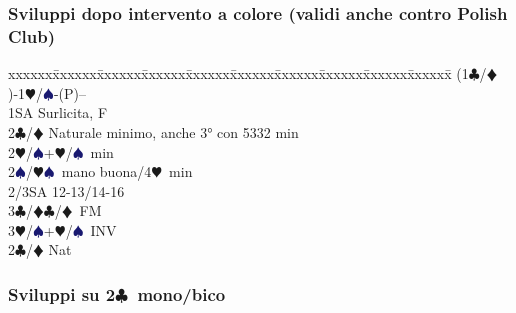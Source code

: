 \documentclass[a4paper,italian]{article}
\newcommand{\BC}{\textcolor{OliveGreen}{$\clubsuit$}}
\newcommand{\BD}{\textcolor{RedOrange}{$\vardiamondsuit$}}
\newcommand{\BH}{\textcolor{Red2}{$\varheartsuit${}}}
\newcommand{\BS}{\textcolor{MidnightBlue}{$\spadesuit${}}}
\newcommand{\pdfc}{\texorpdfstring{\BC{}}{C}}
\newenvironment{bidtable}
{\begin{tabbing}

    xxxxxx\=xxxxxx\=xxxxxx\=xxxxxx\=xxxxxx\=xxxxxx\=xxxxxx\=xxxxxx\=xxxxxx\=xxxxxx\=\kill}
{\end{tabbing} }%
\begin{document}
\begin{multicols}{2}
                                        \subsubsection{Sviluppi dopo intervento a colore (validi anche contro Polish Club)}
                                        \begin{bidtable}
                                            (1\BC/\BD)-1\BH/\BS-(P)--\\
                                            1SA \> Surlicita, F\+\\
                                            2\BC/\BD \> Naturale minimo, anche 3° con 5332 min\\
                                            2\BH/\BS {}+\BH/\BS\ min\\
                                            2\BS/\BH {}\BS\ mano buona/4\BH\ min\\
                                            2/3SA  12-13/14-16\\
                                            3\BC/\BD {}\BC/\BD\ FM\\
                                            3\BH/\BS {}+\BH/\BS\ INV\-\\
                                            2\BC/\BD \> Nat\\
                                        \end{bidtable}
                                        
                                        \columnbreak
                                        \subsubsection{Sviluppi su 2\pdfc\ mono/bico}


\end{multicols}
\end{document}
